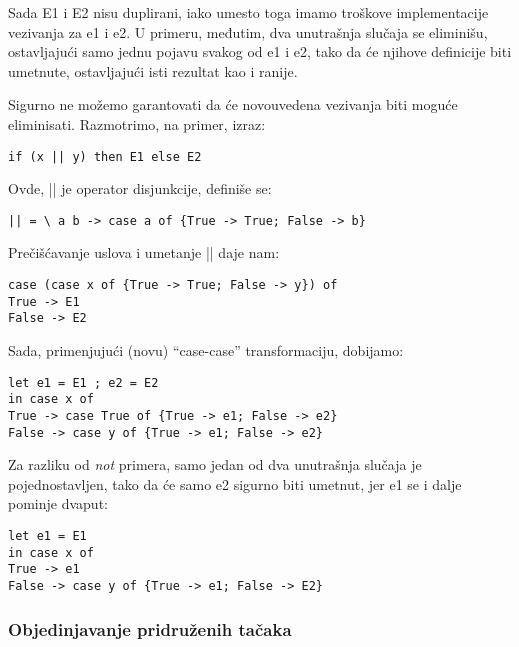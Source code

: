 Sada E1 i E2 nisu duplirani, iako umesto toga imamo troškove implementacije vezivanja za e1 i e2. U primeru, međutim, dva unutrašnja slučaja se eliminišu, ostavljajući samo jednu pojavu svakog od e1 i e2, tako da će njihove definicije biti umetnute, ostavljajući isti rezultat kao i ranije.

Sigurno ne možemo garantovati da će novouvedena vezivanja biti moguće eliminisati. Razmotrimo, na primer, izraz:
\begin{verbatim}
if (x || y) then E1 else E2
\end{verbatim}
Ovde, || je operator disjunkcije, definiše se:
\begin{verbatim}
|| = \ a b -> case a of {True -> True; False -> b}
\end{verbatim}

Prečišćavanje uslova i umetanje || daje nam:
\begin{verbatim}
case (case x of {True -> True; False -> y}) of
True -> E1
False -> E2
\end{verbatim}

Sada, primenjujući (novu) “case-case” transformaciju, dobijamo:
\begin{verbatim}
let e1 = E1 ; e2 = E2
in case x of
True -> case True of {True -> e1; False -> e2}
False -> case y of {True -> e1; False -> e2}
\end{verbatim}

Za razliku od \textit{not} primera, samo jedan od dva unutrašnja slučaja je pojednostavljen, tako da će samo e2 sigurno biti umetnut, jer e1 se i dalje pominje dvaput:
\begin{verbatim}
let e1 = E1
in case x of
True -> e1
False -> case y of {True -> e1; False -> E2}
\end{verbatim}

\subsubsection{Objedinjavanje pridruženih tačaka}
\label{sec:podpodnaslovGeneralization}

